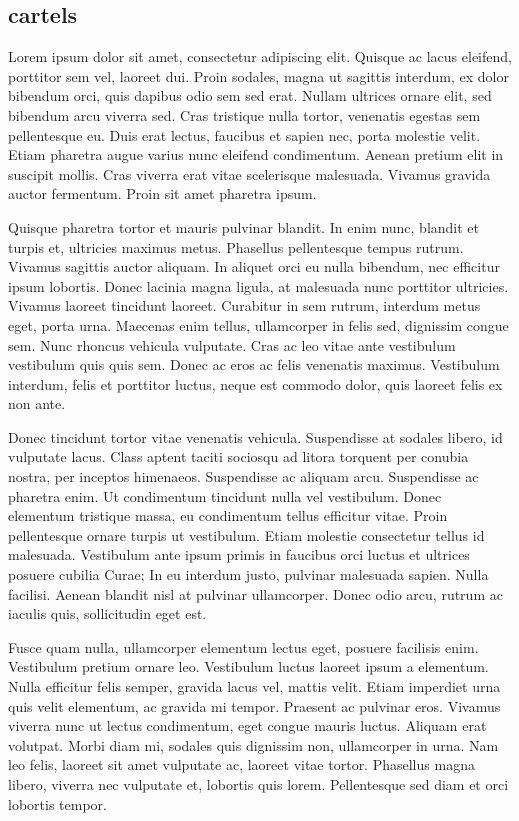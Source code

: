 \subsection{cartels}



Lorem ipsum dolor sit amet, consectetur adipiscing elit. Quisque ac lacus eleifend, porttitor sem vel, laoreet dui. Proin sodales, magna ut sagittis interdum, ex dolor bibendum orci, quis dapibus odio sem sed erat. Nullam ultrices ornare elit, sed bibendum arcu viverra sed. Cras tristique nulla tortor, venenatis egestas sem pellentesque eu. Duis erat lectus, faucibus et sapien nec, porta molestie velit. Etiam pharetra augue varius nunc eleifend condimentum. Aenean pretium elit in suscipit mollis. Cras viverra erat vitae scelerisque malesuada. Vivamus gravida auctor fermentum. Proin sit amet pharetra ipsum.

Quisque pharetra tortor et mauris pulvinar blandit. In enim nunc, blandit et turpis et, ultricies maximus metus. Phasellus pellentesque tempus rutrum. Vivamus sagittis auctor aliquam. In aliquet orci eu nulla bibendum, nec efficitur ipsum lobortis. Donec lacinia magna ligula, at malesuada nunc porttitor ultricies. Vivamus laoreet tincidunt laoreet. Curabitur in sem rutrum, interdum metus eget, porta urna. Maecenas enim tellus, ullamcorper in felis sed, dignissim congue sem. Nunc rhoncus vehicula vulputate. Cras ac leo vitae ante vestibulum vestibulum quis quis sem. Donec ac eros ac felis venenatis maximus. Vestibulum interdum, felis et porttitor luctus, neque est commodo dolor, quis laoreet felis ex non ante.

Donec tincidunt tortor vitae venenatis vehicula. Suspendisse at sodales libero, id vulputate lacus. Class aptent taciti sociosqu ad litora torquent per conubia nostra, per inceptos himenaeos. Suspendisse ac aliquam arcu. Suspendisse ac pharetra enim. Ut condimentum tincidunt nulla vel vestibulum. Donec elementum tristique massa, eu condimentum tellus efficitur vitae. Proin pellentesque ornare turpis ut vestibulum. Etiam molestie consectetur tellus id malesuada. Vestibulum ante ipsum primis in faucibus orci luctus et ultrices posuere cubilia Curae; In eu interdum justo, pulvinar malesuada sapien. Nulla facilisi. Aenean blandit nisl at pulvinar ullamcorper. Donec odio arcu, rutrum ac iaculis quis, sollicitudin eget est.

Fusce quam nulla, ullamcorper elementum lectus eget, posuere facilisis enim. Vestibulum pretium ornare leo. Vestibulum luctus laoreet ipsum a elementum. Nulla efficitur felis semper, gravida lacus vel, mattis velit. Etiam imperdiet urna quis velit elementum, ac gravida mi tempor. Praesent ac pulvinar eros. Vivamus viverra nunc ut lectus condimentum, eget congue mauris luctus. Aliquam erat volutpat. Morbi diam mi, sodales quis dignissim non, ullamcorper in urna. Nam leo felis, laoreet sit amet vulputate ac, laoreet vitae tortor. Phasellus magna libero, viverra nec vulputate et, lobortis quis lorem. Pellentesque sed diam et orci lobortis tempor.

